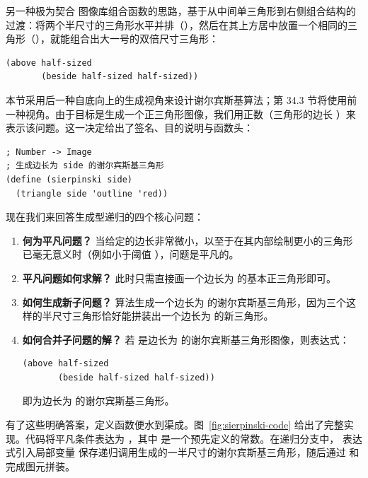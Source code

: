 另一种极为契合  图像库组合函数的思路，基于从中间单三角形到右侧组合结构的过渡：将两个半尺寸的三角形水平并排（），然后在其上方居中放置一个相同的三角形（），就能组合出大一号的双倍尺寸三角形：

\begin{lstlisting}[language=BSL]
(above half-sized
       (beside half-sized half-sized))
\end{lstlisting}

本节采用后一种自底向上的生成视角来设计谢尔宾斯基算法；第 34.3 节将使用前一种视角。由于目标是生成一个正三角形图像，我们用正数（三角形的边长 ）来表示该问题。这一决定给出了签名、目的说明与函数头：

\begin{lstlisting}[language=BSL]
; Number -> Image
; 生成边长为 side 的谢尔宾斯基三角形
(define (sierpinski side)
  (triangle side 'outline 'red))
\end{lstlisting}

现在我们来回答生成型递归的四个核心问题：
\begin{enumerate}
  \item \textbf{何为平凡问题？} 当给定的边长非常微小，以至于在其内部绘制更小的三角形已毫无意义时（例如小于阈值 ），问题是平凡的。
  \item \textbf{平凡问题如何求解？} 此时只需直接画一个边长为  的基本正三角形即可。
  \item \textbf{如何生成新子问题？} 算法生成一个边长为  的谢尔宾斯基三角形，因为三个这样的半尺寸三角形恰好能拼装出一个边长为  的新三角形。
  \item \textbf{如何合并子问题的解？} 若  是边长为  的谢尔宾斯基三角形图像，则表达式：
\begin{lstlisting}[language=BSL]
(above half-sized
       (beside half-sized half-sized))
\end{lstlisting}
  即为边长为  的谢尔宾斯基三角形。
\end{enumerate}

有了这些明确答案，定义函数便水到渠成。图~\ref{fig:sierpinski-code} 给出了完整实现。代码将平凡条件表达为 ，其中  是一个预先定义的常数。在递归分支中， 表达式引入局部变量  保存递归调用生成的一半尺寸的谢尔宾斯基三角形，随后通过  和  完成图元拼装。

